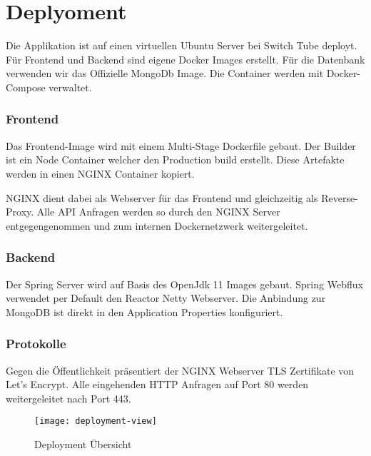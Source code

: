 \section{Deplyoment}

Die Applikation ist auf einen virtuellen Ubuntu Server bei Switch Tube deployt.
Für Frontend und Backend sind eigene Docker Images erstellt.
Für die Datenbank verwenden wir das Offizielle MongoDb Image.
Die Container werden mit Docker-Compose verwaltet.

\subsubsection*{Frontend}
Das Frontend-Image wird mit einem Multi-Stage Dockerfile gebaut.
Der Builder ist ein Node Container welcher den Production build erstellt.
Diese Artefakte werden in einen NGINX Container kopiert.

NGINX dient dabei als Webserver für das Frontend und gleichzeitig als Reverse-Proxy.
Alle API Anfragen werden so durch den NGINX Server entgegengenommen und zum internen Dockernetzwerk weitergeleitet.

\subsubsection*{Backend}
Der Spring Server wird auf Basis des OpenJdk 11 Images gebaut.
Spring Webflux verwendet per Default den Reactor Netty Webserver.
Die Anbindung zur MongoDB ist direkt in den Application Properties konfiguriert.


\subsubsection*{Protokolle}
Gegen die Öffentlichkeit präsentiert der NGINX Webserver TLS Zertifikate von Let's Encrypt.
Alle eingehenden HTTP Anfragen auf Port 80 werden weitergeleitet nach Port 443.


\begin{figure}[H]
    \texttt{[image: deployment-view]}
    \caption{Deployment Übersicht}
    \label{fig:Deplyoment}
\end{figure}